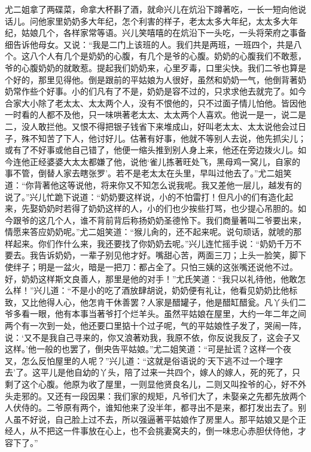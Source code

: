 \begin{parag}


    尤二姐拿了两碟菜，命拿大杯斟了酒，就命兴儿在炕沿下蹲著吃，一长一短向他说话儿。问他家里奶奶多大年纪，怎个利害的样子，老太太多大年纪，太太多大年纪，姑娘几个，各样家常等语。兴儿笑嘻嘻的在炕沿下一头吃，一头将荣府之事备细告诉他母女。又说：“我是二门上该班的人。我们共是两班，一班四个，共是八个。这八个人有几个是奶奶的心腹，有几个是爷的心腹。奶奶的心腹我们不敢惹，爷的心腹奶奶的就敢惹。提起我们奶奶来，心里歹毒，口里尖快。我们二爷也算是个好的，那里见得他。倒是跟前的平姑娘为人很好，虽然和奶奶一气，他倒背著奶奶常作些个好事。小的们凡有了不是，奶奶是容不过的，只求求他去就完了。如今合家大小除了老太太、太太两个人，没有不恨他的，只不过面子情儿怕他。皆因他一时看的人都不及他，只一味哄著老太太、太太两个人喜欢。他说一是一，说二是二，没人敢拦他。又恨不得把银子钱省下来堆成山，好叫老太太、太太说他会过日子，殊不知苦了下人，他讨好儿。估著有好事，他就不等别人去说，他先抓尖儿；或有了不好事或他自己错了，他便一缩头推到别人身上来，他还在旁边拨火儿。如今连他正经婆婆大太太都嫌了他，说他‘雀儿拣著旺处飞，黑母鸡一窝儿，自家的事不管，倒替人家去瞎张罗’。若不是老太太在头里，早叫过他去了。”尤二姐笑道：“你背著他这等说他，将来你又不知怎么说我呢。我又差他一层儿，越发有的说了。”兴儿忙跪下说道：“奶奶要这样说，小的不怕雷打！但凡小的们有造化起来，先娶奶奶时若得了奶奶这样的人，小的们也少挨些打骂，也少提心吊胆的。如今跟爷的这几个人，谁不背前背后称扬奶奶圣德怜下。我们商量著叫二爷要出来，情愿来答应奶奶呢。”尤二姐笑道：“猴儿肏的，还不起来呢。说句顽话，就唬的那样起来。你们作什么来，我还要找了你奶奶去呢。”兴儿连忙摇手说：“奶奶千万不要去。我告诉奶奶，一辈子别见他才好。嘴甜心苦，两面三刀；上头一脸笑，脚下使绊子；明是一盆火，暗是一把刀：都占全了。只怕三姨的这张嘴还说他不过。好，奶奶这样斯文良善人，那里是他的对手！”尤氏笑道：“我只以礼待他，他敢怎么样！”兴儿道：“不是小的吃了酒放肆胡说，奶奶便有礼让，他看见奶奶比他标致，又比他得人心，他怎肯干休善罢？人家是醋罐子，他是醋缸醋瓮。凡丫头们二爷多看一眼，他有本事当著爷打个烂羊头。虽然平姑娘在屋里，大约一年二年之间两个有一次到一处，他还要口里掂十个过子呢，气的平姑娘性子发了，哭闹一阵，说：‘又不是我自己寻来的，你又浪著劝我，我原不依，你反说我反了，这会子又这样。’他一般的也罢了，倒央告平姑娘。”尤二姐笑道：“可是扯谎？这样一个夜叉，怎么反怕屋里的人呢？”兴儿道：“这就是俗语说的‘天下逃不过一个理字去’了。这平儿是他自幼的丫头，陪了过来一共四个，嫁人的嫁人，死的死了，只剩了这个心腹。他原为收了屋里，一则显他贤良名儿，二则又叫拴爷的心，好不外头走邪的。又还有一段因果：我们家的规矩，凡爷们大了，未娶亲之先都先放两个人伏侍的。二爷原有两个，谁知他来了没半年，都寻出不是来，都打发出去了。别人虽不好说，自己脸上过不去，所以强逼著平姑娘作了房里人。那平姑娘又是个正经人，从不把这一件事放在心上，也不会挑妻窝夫的，倒一味忠心赤胆伏侍他，才容下了。”
\end{parag}


